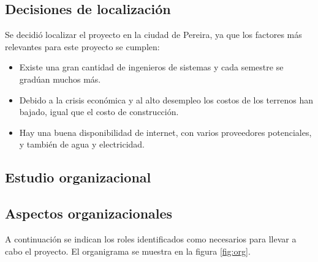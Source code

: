 \documentclass[a4paper, 12pt, oneside]{article}
\begin{document}
	\subsection{Decisiones de localización}
	Se decidió localizar el proyecto en la ciudad de Pereira, ya que los factores más relevantes para este proyecto se cumplen: 

	\begin{itemize}
	 \item Existe una gran cantidad de ingenieros de sistemas y cada semestre se gradúan muchos más.
	 \item Debido a la crisis económica y al alto desempleo los costos de los terrenos han bajado, igual que el costo de construcción.
	 \item Hay una buena disponibilidad de internet, con varios proveedores potenciales, y también de agua y electricidad.
	\end{itemize}
	\clearpage
	
	\begin{center}
	\section{Estudio organizacional}
	\end{center}
	
	\subsection{Aspectos organizacionales}

	A continuación se indican los roles identificados como necesarios para llevar a cabo el proyecto. El organigrama se muestra en la figura \ref{fig:org}.
\end{document}
